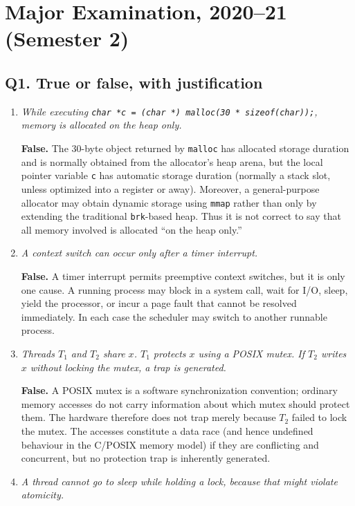 \section{Major Examination, 2020--21 (Semester 2)}

\subsection*{Q1. True or false, with justification}

\begin{enumerate}
\item[(a)] \emph{While executing \texttt{char *c = (char *) malloc(30 *
sizeof(char));}, memory is allocated on the heap only.}

\textbf{False.}  The 30-byte object returned by \texttt{malloc} has allocated
storage duration and is normally obtained from the allocator's heap arena,
but the local pointer variable \texttt{c} has automatic storage duration
(normally a stack slot, unless optimized into a register or away).  Moreover,
a general-purpose allocator may obtain dynamic
storage using \texttt{mmap} rather than only by extending the traditional
\texttt{brk}-based heap.  Thus it is not correct to say that all memory
involved is allocated ``on the heap only.''

\item[(b)] \emph{A context switch can occur only after a timer interrupt.}

\textbf{False.}  A timer interrupt permits preemptive context switches, but
it is only one cause.  A running process may block in a system call, wait for
I/O, sleep, yield the processor, or incur a page fault that cannot be
resolved immediately.  In each case the scheduler may switch to another
runnable process.

\item[(c)] \emph{Threads \(T_1\) and \(T_2\) share \(x\).  \(T_1\) protects
\(x\) using a POSIX mutex.  If \(T_2\) writes \(x\) without locking the
mutex, a trap is generated.}

\textbf{False.}  A POSIX mutex is a software synchronization convention;
ordinary memory accesses do not carry information about which mutex should
protect them.  The hardware therefore does not trap merely because \(T_2\)
failed to lock the mutex.  The accesses constitute a data race (and hence
undefined behaviour in the C/POSIX memory model) if they are conflicting and
concurrent, but no protection trap is inherently generated.

\item[(d)] \emph{A thread cannot go to sleep while holding a lock, because
that might violate atomicity.}


\end{enumerate}
